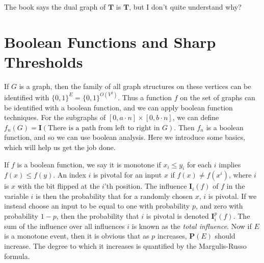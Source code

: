 The book says the dual graph of $\mathbf{T}$ is $\mathbf{T}$, but I don't quite understand why?

\section{Boolean Functions and Sharp Thresholds}

If $G$ is a graph, then the family of all graph structures on these vertices can be identified with $\{ 0, 1 \}^E = \{ 0, 1 \}^{O(V^2)}$. Thus a function $f$ on the set of graphs can be identified with a boolean function, and we can apply boolean function techniques. For the subgraphs of $[0, a \cdot n] \times [0, b \cdot n]$, we can define $f_n(G) = \mathbf{I}(\text{There is a path from left to right in $G$})$. Then $f_n$ is a boolean function, and so we can use boolean analysis. Here we introduce some basics, which will help us get the job done.

If $f$ is a boolean function, we say it is monotone if $x_i \leq y_i$ for each $i$ implies $f(x) \leq f(y)$. An index $i$ is pivotal for an input $x$ if $f(x) \neq f(x^i)$, where $i$ is $x$ with the bit flipped at the $i$'th position. The influence $\mathbf{I}_i(f)$ of $f$ in the variable $i$ is then the probability that for a randomly chosen $x$, $i$ is pivotal. If we instead choose an input to be equal to one with probability $p$, and zero with probability $1 - p$, then the probability that $i$ is pivotal is denoted $\mathbf{I}_i^p(f)$. The sum of the influence over all influences $i$ is known as the {\it total influence}. Now if $E$ is a monotone event, then it is obvious that as $p$ increases, $\mathbf{P}(E)$ should increase. The degree to which it increases is quantified by the Margulis-Russo formula.

